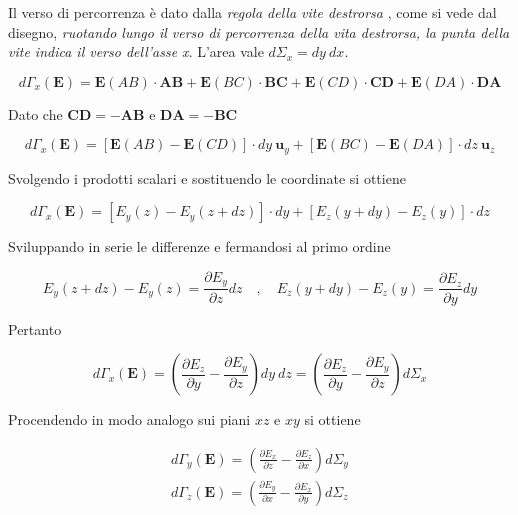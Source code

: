 Il verso di percorrenza è dato dalla \emph{regola della vite destrorsa} , come si vede dal disegno, \emph{ruotando lungo il verso di percorrenza della vita destrorsa, la punta della vite indica il verso dell'asse x}. L'area vale $d \Sigma_x = dy \ dx$.

\begin{equation*}
    d \Gamma_x(\mathbf{E}) = \mathbf{E}(AB) \cdot \mathbf{AB} + \mathbf{E}(BC) \cdot \mathbf{BC} + \mathbf{E}(CD) \cdot \mathbf{CD} + \mathbf{E}(DA) \cdot \mathbf{DA}
\end{equation*}

Dato che $\mathbf{CD} = \mathbf{-AB}$ e $\mathbf{DA} = \mathbf{-BC}$ 

\begin{equation*}
    d \Gamma_x(\mathbf{E}) = [\mathbf{E}(AB) - \mathbf{E}(CD)] \cdot dy \ \mathbf{u}_y + [\mathbf{E}(BC) - \mathbf{E}(DA)] \cdot dz \ \mathbf{u}_z
\end{equation*}

Svolgendo i prodotti scalari e sostituendo le coordinate si ottiene 

\begin{equation*}
    d \Gamma_x(\mathbf{E}) = [E_y(z) - E_y(z + dz)] \cdot dy  + [E_z(y + dy) - E_z(y)] \cdot dz
\end{equation*}

Sviluppando in serie le differenze e fermandosi al primo ordine 

\begin{equation*}
    E_y(z + dz) - E_y(z) = \frac{\partial E_y}{\partial z} dz \quad , \quad E_z(y + dy) - E_z(y) = \frac{\partial E_z}{\partial y} dy
\end{equation*}

Pertanto 

\begin{equation*}
    d \Gamma_x(\mathbf{E}) = (\frac{\partial E_z}{\partial y} - \frac{\partial E_y}{\partial z} ) dy\ dz = (\frac{\partial E_z}{\partial y} - \frac{\partial E_y}{\partial z} ) d \Sigma_x
\end{equation*}

\newpage

Procendendo in modo analogo sui piani $xz$ e $xy$ si ottiene 

\begin{align*}
        d \Gamma_y(\mathbf{E}) = (\frac{\partial E_x}{\partial z} - \frac{\partial E_z}{\partial x} ) d \Sigma_y   \\  d \Gamma_z(\mathbf{E}) = (\frac{\partial E_y}{\partial x} - \frac{\partial E_x}{\partial y} ) d \Sigma_z
\end{align*}


